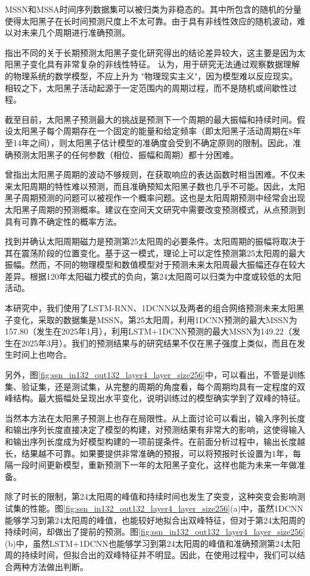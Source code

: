 MSSN和MSSA时间序列数据集可以被归类为非稳态的。其中所包含的随机的分量使得太阳黑子在长时间预测尺度上不太可靠。由于具有非线性效应的随机波动，难以对未来几个周期进行准确预测\citep{charbonneau2010dynamo,petrovay2010solar}。

\citet{solanki2011analyzing}指出不同的关于长期预测太阳黑子变化研究得出的结论差异较大，这主要是因为太阳黑子变化具有非常复杂的非线性特征。 \citet{charbonneau2010dynamo}认为，用于研究无法通过观察数据理解的物理系统的数学模型，不应上升为 "物理现实主义"，因为模型难以反应现实。相较之下，太阳黑子活动起源于一定范围内的周期过程，而不是随机或间歇性过程\citep{mendoza2011mid}。

截至目前，太阳黑子预测最大的挑战是预测下一个周期的最大振幅和持续时间\citep{petrovay2010solar}。\citet{herrera2015reconstruction}假设太阳黑子每个周期存在一个固定的能量和给定频率（即太阳黑子活动周期在8年至14年之间），则太阳黑子估计模型的准确度会受到不确定原则的限制。因此，准确预测太阳黑子的任何参数（相位、振幅和周期）都十分困难。

\citet{gleissberg1939long}曾指出太阳黑子周期的波动不够规则，在获取响应的表达函数时相当困难。不仅未来太阳周期的特性难以预测，而且准确预知太阳黑子数也几乎不可能。因此，太阳黑子周期预测的问题可以被视作一个概率问题。这也是太阳周期预测中经常会出现太阳黑子周期的预测概率。\citet{camporeale2019challenge}建议在空间天文研究中需要改变预测模式，从点预测到具有可靠不确定性的概率方法。

找到并确认太阳周期磁力是预测第25太阳周的必要条件。太阳周期的振幅将取决于其在震荡阶段的位置变化。基于这一模式，理论上可以定性预测第25太阳周的最大振幅。然而，不同的物理模型和数值模型对于预测未来太阳周最大振幅还存在较大差异。根据120年太阳磁力模式的负向，第24太阳周可以归类为中度或较低的太阳活动。

本研究中，我们使用了LSTM-RNN、1DCNN以及两者的组合网络预测未来太阳黑子变化，采取的数据集是MSSN。第25太阳周，利用1DCNN预测的最大MSSN为157.80（发生在2025年1月），利用LSTM+1DCNN预测的最大MSSN为149.22（发生在2025年3月）。我们的预测结果与\citet{covas2019neural}的研究结果不仅在黑子强度上类似，而且在发生时间上也吻合。

另外，图\ref{fig:ssn_in132_out132_layer4_layer_size256}中，可以看出，不管是训练集、验证集，还是测试集，从完整的周期的角度看，每个周期均具有一定程度的双峰结构。最大振幅处呈现出水平变化，说明训练过的模型确实学到了双峰的特征。

当然本方法在太阳黑子预测上也存在局限性。从上面讨论可以看出，输入序列长度和输出序列长度直接决定了模型的构建，对预测结果有非常大的影响，这使得输入和输出序列长度成为好模型构建的一项前提条件。在前面分析过程中，输出长度越长，结果越不可靠。如果要提供非常准确的预报，可以将预报时长设置为1年，每隔一段时间更新模型，重新预测下一年的太阳黑子变化，这样也能为未来一年做准备。

除了时长的限制，第24太阳周的峰值和持续时间也发生了突变，这种突变会影响测试集的性能。图\ref{fig:ssn_in132_out132_layer4_layer_size256}(a)中，虽然1DCNN能够学习到第24太阳周的峰值，也能较好地拟合出双峰特征，但对于第24太阳周的持续时间，却做出了提前的预测。图\ref{fig:ssn_in132_out132_layer4_layer_size256}(b)中，虽然LSTM+1DCNN也能够学习到第24太阳周的峰值和准确预测第24太阳周的持续时间，但拟合出的双峰特征并不明显。因此，在使用过程中，我们可以结合两种方法做出判断。


